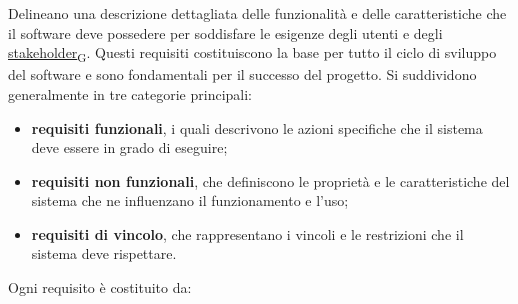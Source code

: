Delineano una descrizione dettagliata delle funzionalità e delle caratteristiche che il software deve possedere per soddisfare le esigenze degli utenti e degli \href{https://7last.github.io/docs/rtb/documentazione-interna/glossario\#stakeholder}{stakeholder\textsubscript{G}}. Questi requisiti costituiscono la base per tutto il ciclo di sviluppo del software e sono fondamentali per il successo del progetto. Si suddividono generalmente in tre categorie principali:
\begin{itemize}
	\item \textbf{requisiti funzionali}, i quali descrivono le azioni specifiche che il sistema deve essere in grado di eseguire;
	\item \textbf{requisiti non funzionali}, che definiscono le proprietà e le caratteristiche del sistema che ne influenzano il funzionamento e l'uso;
	\item \textbf{requisiti di vincolo}, che rappresentano i vincoli e le restrizioni che il sistema deve rispettare.
\end{itemize}
Ogni requisito è costituito da:
